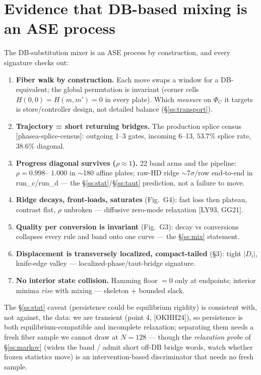 \documentclass[11pt]{article}
\newcommand{\Di}{\lvert D_i\rvert}
\begin{document}
\section{Evidence that DB-based mixing is an ASE process}
The DB-substitution mixer is an ASE process by construction, and every signature checks out:
\begin{enumerate}
\item \textbf{Fiber walk by construction.} Each move swaps a window for a DB-equivalent; the global
permutation is invariant (corner cells $H(0,0)=H(m,m')=0$ in every plate). Which \emph{measure} on
$\Phi_C$ it targets is store/controller design, not detailed balance (\S\ref{ss:transport}).
\item \textbf{Trajectory = short returning bridges.} The production splice census
[phasea-splice-census]: outgoing 1--3 gates, incoming 6--13, $53.7\%$ splice rate, $38.6\%$ diagonal.
\item \textbf{Progress diagonal survives ($\rho\approx1$).} 22 band arms and the pipeline: $\rho=0.998$--%
$1.000$ in $\sim$180 affine plates; raw-HD ridge $\sim7\sigma$/row end-to-end in run\_c/run\_d --- the
\S\ref{ss:stat}/\S\ref{ss:taut} prediction, not a failure to move.
\item \textbf{Ridge decays, front-loads, saturates} (Fig.~G4): fast loss then plateau, contrast flat,
$\rho$ unbroken --- diffusive zero-mode relaxation [LY93, GG21].
\item \textbf{Quality per conversion is invariant} (Fig.~G3): decay vs conversions collapses every
rule and band onto one curve --- the \S\ref{ss:mix} statement.
\item \textbf{Displacement is transversely localized, compact-tailed} (\S3): tight $\Di$, knife-edge
valley --- localized-phase/taut-bridge signature.
\item \textbf{No interior state collision.} Hamming floor $=0$ only at endpoints; interior minima
\emph{rise} with mixing --- skeleton $+$ bounded slack.
\end{enumerate}
The \S\ref{ss:stat} caveat (persistence could be equilibrium rigidity) is consistent with, not against,
the data: we are transient (point 4, [OKHH24]), so persistence is both equilibrium-compatible and
incomplete relaxation; separating them needs a fresh fiber sample we cannot draw at $N{=}128$ ---
though the \emph{relaxation probe} of \S\ref{ss:markov} (widen the band / admit short off-DB bridge
words, watch whether frozen statistics move) is an intervention-based discriminator that needs no
fresh sample.
\end{document}
